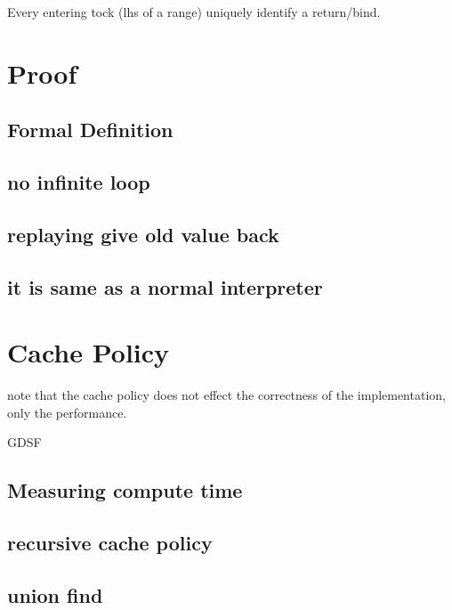 \documentclass[acmsmall]{acmart}
\begin{document}
	Every entering tock (lhs of a range) uniquely identify a return/bind.
	
	\section{Proof}
	\subsection{Formal Definition}
	\subsection{no infinite loop}
	\subsection{replaying give old value back}
	\subsection{it is same as a normal interpreter}
	\section{Cache Policy}
	note that the cache policy does not effect the correctness of the implementation, only the performance.
	
	GDSF
	\subsection{Measuring compute time}
	\subsection{recursive cache policy}
	\subsection{union find}
\end{document}
